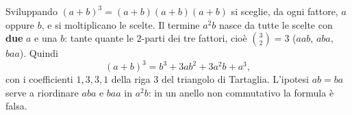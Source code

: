 \begin{spiegazione}
    Sviluppando $(a + b)^3 = (a + b)(a + b)(a + b)$ si sceglie, da ogni fattore, $a$ oppure $b$, e si moltiplicano le scelte. Il
    termine $a^2 b$ nasce da tutte le scelte con \textbf{due} $a$ e una $b$: tante quante le $2$-parti dei tre fattori, cioè $\binom{3}{2} = 3$
    ($aab$, $aba$, $baa$). Quindi
    \[ (a + b)^3 = b^3 + 3ab^2 + 3a^2 b + a^3, \]
    con i coefficienti $1, 3, 3, 1$ della riga $3$ del triangolo di Tartaglia. L'ipotesi $ab = ba$ serve a riordinare $aba$ e $baa$ in
    $a^2 b$: in un anello non commutativo la formula è falsa.
\end{spiegazione}
